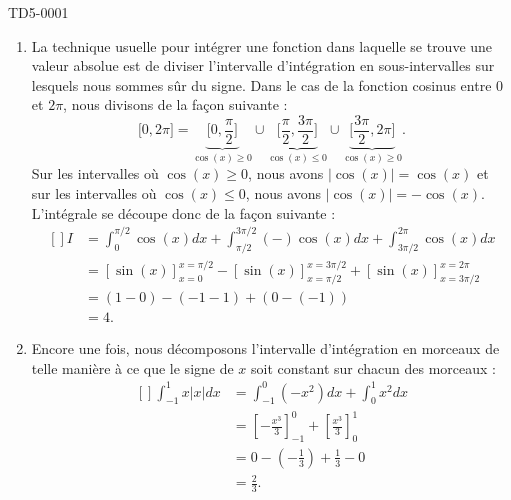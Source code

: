 
\begin{corrige}{TD5-0001}

	\begin{enumerate}
		\item
			La technique usuelle pour intégrer une fonction dans laquelle se trouve une valeur absolue est de diviser l'intervalle d'intégration en sous-intervalles sur lesquels nous sommes sûr du signe. Dans le cas de la fonction cosinus entre $0$ et $2\pi$, nous divisons de la façon suivante :
			\begin{equation}
				\mathopen[ 0 , 2\pi \mathclose]=\underbrace{\mathopen[ 0 , \frac{ \pi }{2} \mathclose]}_{\cos(x)\geq 0}\cup\underbrace{\mathopen[ \frac{ \pi }{2} , \frac{ 3\pi }{2} \mathclose]}_{\cos(x)\leq 0}\cup\underbrace{\mathopen[ \frac{ 3\pi }{2} , 2\pi \mathclose]}_{\cos(x)\geq 0}.
			\end{equation}
			Sur les intervalles où $\cos(x)\geq 0$, nous avons $| \cos(x) |=\cos(x)$ et sur les intervalles où $\cos(x)\leq 0$, nous avons $| \cos(x) |=-\cos(x)$. L'intégrale se découpe donc de la façon suivante :
			\begin{equation}
				\begin{aligned}[]
					I&=\int_{0}^{\pi/2}\cos(x)dx+\int_{\pi/2}^{3\pi/2}(-)\cos(x)dx+\int_{3\pi/2}^{2\pi}\cos(x)dx\\
					&=[\sin(x)]_{x=0}^{x=\pi/2}-[\sin(x)]_{x=\pi/2}^{x=3\pi/2}+[\sin(x)]_{x=3\pi/2}^{x=2\pi}\\
					&=(1-0)-(-1-1)+(0-(-1))\\
					&=4.
				\end{aligned}
			\end{equation}
		\item
			Encore une fois, nous décomposons l'intervalle d'intégration en morceaux de telle manière à ce que le signe de $x$ soit constant sur chacun des morceaux :
			\begin{equation}
				\begin{aligned}[]
					\int_{-1}^1x| x |dx&=\int_{-1}^0(-x^2)dx+\int_0^1x^2dx\\
					&=\left[ -\frac{ x^3 }{ 3 } \right]_{-1}^0+\left[ \frac{ x^3 }{ 3 } \right]_0^1\\
					&=0-\left( -\frac{ 1 }{ 3 } \right)+\frac{1}{ 3 }-0\\
					&=\frac{ 2 }{ 3 }.
				\end{aligned}

\end{equation}
\end{enumerate}
\end{corrige}

